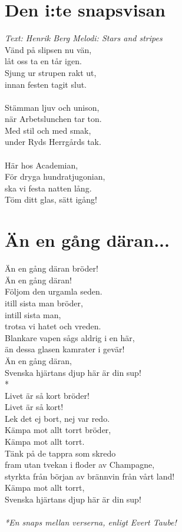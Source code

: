 \section{Den i:te snapsvisan}
\textit{Text: Henrik Berg \hspace{5mm} Melodi: Stars and stripes}
\vspace{2mm}\\
Vänd på slipsen nu vän,\\
låt oss ta en tår igen.\\
Sjung ur strupen rakt ut,\\
innan festen tagit slut.\\
\\
Stämman ljuv och unison,\\
när Arbetslunchen tar ton.\\
Med stil och med smak,\\
under Ryds Herrgårds tak.\\
\\
Här hos Academian,\\
För dryga hundratjugonian,\\
ska vi festa natten lång.\\
Töm ditt glas, sätt igång!\\
\section{Än en gång däran...}
Än en gång däran bröder!\\
Än en gång däran!\\
Följom den urgamla seden.\\
itill sista man bröder,\\
intill sista man,\\
trotsa vi hatet och vreden.\\
Blankare vapen sågs aldrig i en här,\\
än dessa glasen kamrater i gevär!\\
Än en gång däran,\\
Svenska hjärtans djup här är din sup!\\
*\\
Livet är så kort bröder!\\
Livet är så kort!\\
Lek det ej bort, nej var redo.\\
Kämpa mot allt torrt bröder,\\
Kämpa mot allt torrt.\\
Tänk på de tappra som skredo\\
fram utan tvekan i floder av Champagne,\\
styrkta från början av brännvin från vårt land!\\
Kämpa mot allt torrt,\\
Svenska hjärtans djup här är din sup!\\
\vspace{\fill}
\\
\textit{*En snaps mellan verserna, enligt Evert Taube!}
